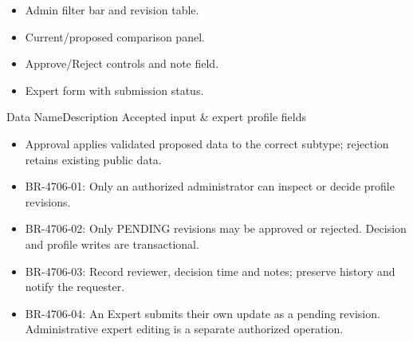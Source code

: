 \begin{itemize}[leftmargin=1.6em,topsep=3pt,itemsep=2pt,parsep=0pt,label=$\bullet$]
    \item Admin filter bar and revision table.
    \item Current/proposed comparison panel.
    \item Approve/Reject controls and note field.
    \item Expert form with submission status.
\end{itemize}


\begin{specdatatable}{Data Name}{Description}
Accepted input & expert profile fields\\ \hline
\end{specdatatable}

\begin{itemize}[leftmargin=1.6em,topsep=3pt,itemsep=2pt,parsep=0pt,label=$\bullet$]
    \item Approval applies validated proposed data to the correct subtype; rejection retains existing public data.
\end{itemize}

\begin{itemize}[leftmargin=1.6em,topsep=3pt,itemsep=2pt,parsep=0pt,label=$\bullet$]\brrulelist
    \item BR-4706-01: Only an authorized administrator can inspect or decide profile revisions.
    \item BR-4706-02: Only PENDING revisions may be approved or rejected. Decision and profile writes are transactional.
    \item BR-4706-03: Record reviewer, decision time and notes; preserve history and notify the requester.
    \item BR-4706-04: An Expert submits their own update as a pending revision. Administrative expert editing is a separate authorized operation.
\end{itemize}

